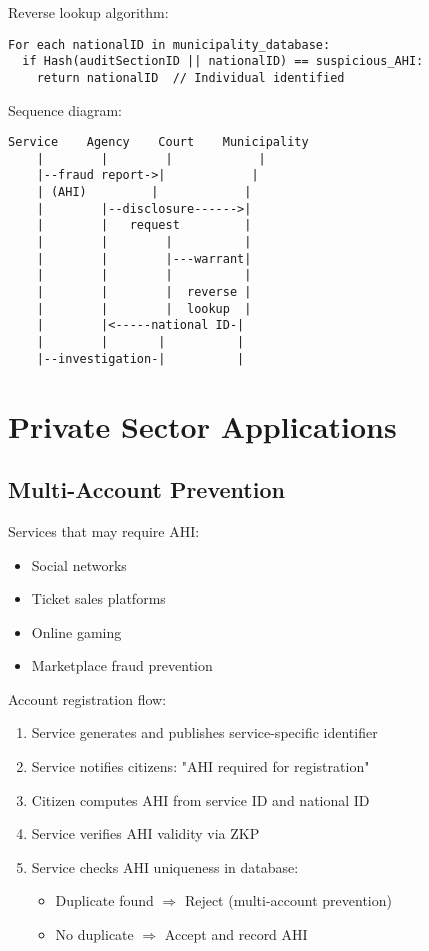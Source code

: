 Reverse lookup algorithm:
\begin{lstlisting}
For each nationalID in municipality_database:
  if Hash(auditSectionID || nationalID) == suspicious_AHI:
    return nationalID  // Individual identified
\end{lstlisting}

Sequence diagram:
\begin{verbatim}
Service    Agency    Court    Municipality
    |        |        |            |
    |--fraud report->|            |
    | (AHI)         |            |
    |        |--disclosure------>|
    |        |   request         |
    |        |        |          |
    |        |        |---warrant|
    |        |        |          |
    |        |        |  reverse |
    |        |        |  lookup  |
    |        |<-----national ID-|
    |        |       |          |
    |--investigation-|          |
\end{verbatim}

\section{Private Sector Applications}

\subsection{Multi-Account Prevention}

Services that may require AHI:
\begin{itemize}
  \item Social networks
  \item Ticket sales platforms
  \item Online gaming
  \item Marketplace fraud prevention
\end{itemize}

Account registration flow:
\begin{enumerate}
  \item Service generates and publishes service-specific identifier
  \item Service notifies citizens: "AHI required for registration"
  \item Citizen computes AHI from service ID and national ID
  \item Service verifies AHI validity via ZKP
  \item Service checks AHI uniqueness in database:
    \begin{itemize}
      \item Duplicate found $\Rightarrow$ Reject (multi-account prevention)
      \item No duplicate $\Rightarrow$ Accept and record AHI
    \end{itemize}
\end{enumerate}

